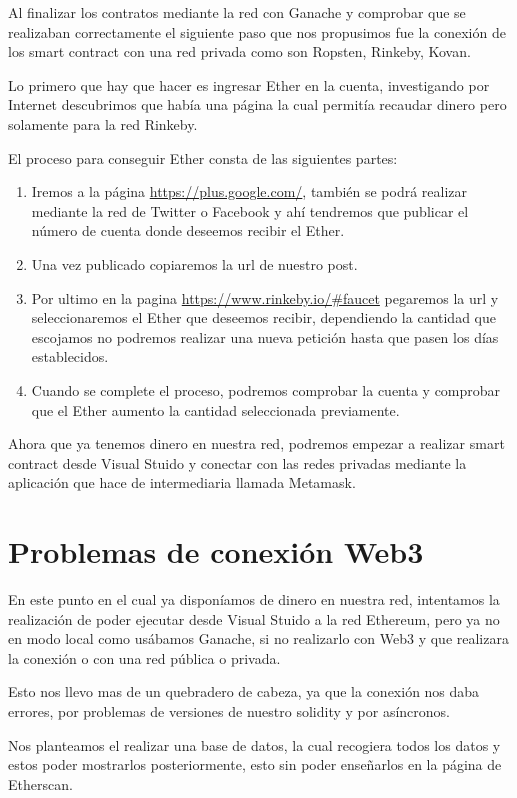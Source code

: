 Al finalizar los contratos mediante la red con Ganache y comprobar que se realizaban correctamente el siguiente paso que nos propusimos fue la conexión de los smart contract con una red privada como son Ropsten, Rinkeby, Kovan.

Lo primero que hay que hacer es ingresar Ether en la cuenta, investigando por Internet descubrimos que había una página la cual permitía recaudar dinero pero solamente para la red Rinkeby.

El proceso para conseguir Ether consta de las siguientes partes:
\begin{enumerate}[1]
	\item Iremos a la página \url{https://plus.google.com/}, también se podrá realizar mediante la red de Twitter o Facebook y ahí tendremos que publicar el número de cuenta donde deseemos recibir el Ether.
	\item Una vez publicado copiaremos la url de nuestro post.
	\item Por ultimo en la pagina \url{https://www.rinkeby.io/#faucet} pegaremos la url y seleccionaremos el Ether que deseemos recibir, dependiendo la cantidad que escojamos no podremos realizar una nueva petición hasta que pasen los días  establecidos.
	\item Cuando se complete el proceso, podremos comprobar la cuenta y comprobar que el Ether aumento la cantidad seleccionada previamente.
\end{enumerate}

Ahora que ya tenemos dinero en nuestra red, podremos empezar a realizar smart contract desde Visual Stuido y conectar con las redes privadas mediante la aplicación que hace de intermediaria llamada Metamask. 
	 
\section{Problemas de conexión Web3}

En este punto en el cual ya disponíamos de dinero en nuestra red, intentamos la realización de poder ejecutar desde Visual Stuido a la red Ethereum, pero ya no en modo local como usábamos Ganache, si no realizarlo con Web3 y que realizara la conexión o con una red pública o privada.

Esto nos llevo mas de un quebradero de cabeza, ya que la conexión nos daba errores, por problemas de versiones de nuestro solidity y por asíncronos.

Nos planteamos el realizar una base de datos, la cual recogiera todos los datos y estos poder mostrarlos posteriormente, esto sin poder enseñarlos en la página de Etherscan.

